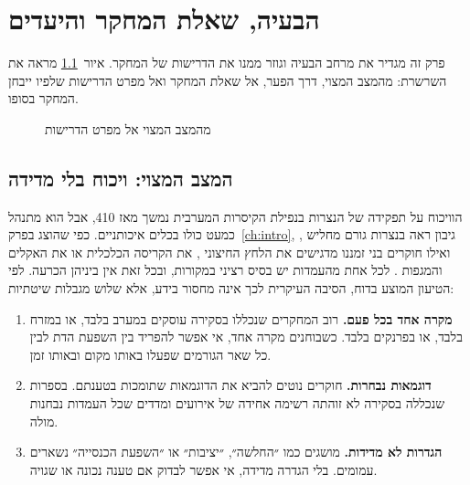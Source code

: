
\chapter{הבעיה, שאלת המחקר והיעדים}
\label{ch:problem}

פרק זה מגדיר את מרחב הבעיה וגוזר ממנו את הדרישות של המחקר. איור~\ref{fig:problem-chain} מראה את השרשרת: מהמצב המצוי, דרך הפער, אל שאלת המחקר ואל מפרט הדרישות שלפיו ייבחן המחקר בסופו.

\begin{figure}[htbp]
  \centering
  
  \caption{מהמצב המצוי אל מפרט הדרישות}
  \label{fig:problem-chain}
\end{figure}

\section{המצב המצוי: ויכוח בלי מדידה}
\label{sec:problem-current}

הוויכוח על תפקידה של הנצרות בנפילת הקיסרות המערבית נמשך מאז 410, אבל הוא מתנהל כמעט כולו בכלים איכותניים. כפי שהוצג בפרק~\ref{ch:intro}, גיבון ראה בנצרות גורם מחליש \cite{gibbon_decline}, ואילו חוקרים בני זמננו מדגישים את הלחץ החיצוני \cite{heather2005fall}, את הקריסה הכלכלית \cite{wardperkins2005fall} או את האקלים והמגפות \cite{harper2017fate}. לכל אחת מהעמדות יש בסיס רציני במקורות, ובכל זאת אין ביניהן הכרעה. לפי הטיעון המוצע בדוח, הסיבה העיקרית לכך אינה מחסור בידע, אלא שלוש מגבלות שיטתיות:

\begin{enumerate}
  \item \textbf{מקרה אחד בכל פעם.} רוב המחקרים שנכללו בסקירה עוסקים במערב בלבד, או במזרח בלבד, או בפרנקים בלבד. כשבוחנים מקרה אחד, אי אפשר להפריד בין השפעת הדת לבין כל שאר הגורמים שפעלו באותו מקום ובאותו זמן.
  \item \textbf{דוגמאות נבחרות.} חוקרים נוטים להביא את הדוגמאות שתומכות בטענתם. בספרות שנכללה בסקירה לא זוהתה רשימה אחידה של אירועים ומדדים שכל העמדות נבחנות מולה.
  \item \textbf{הגדרות לא מדידות.} מושגים כמו ״החלשה״, ״יציבות״ או ״השפעת הכנסייה״ נשארים עמומים. בלי הגדרה מדידה, אי אפשר לבדוק אם טענה נכונה או שגויה.
\end{enumerate}

